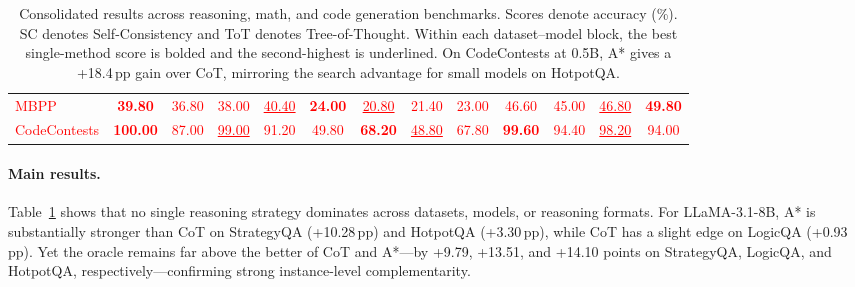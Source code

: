 \documentclass[10pt]{article}
\begin{document}
\begin{table}[t]
{\begin{tabular}{lcccc|cccc|cccc}
\textcolor{red}{MBPP}
& \textcolor{red}{\textbf{39.80}} & \textcolor{red}{36.80} & \textcolor{red}{38.00} & \textcolor{red}{\underline{40.40}}
& \textcolor{red}{\textbf{24.00}} & \textcolor{red}{\underline{20.80}} & \textcolor{red}{21.40} & \textcolor{red}{23.00}
& \textcolor{red}{46.60} & \textcolor{red}{45.00} & \textcolor{red}{\underline{46.80}} & \textcolor{red}{\textbf{49.80}} \\

\textcolor{red}{CodeContests}
& \textcolor{red}{\textbf{100.00}} & \textcolor{red}{87.00} & \textcolor{red}{\underline{99.00}} & \textcolor{red}{91.20}
& \textcolor{red}{49.80} & \textcolor{red}{\textbf{68.20}} & \textcolor{red}{\underline{48.80}} & \textcolor{red}{67.80}
& \textcolor{red}{\textbf{99.60}} & \textcolor{red}{94.40} & \textcolor{red}{\underline{98.20}} & \textcolor{red}{94.00} \\
\bottomrule
\end{tabular}
}
\caption{Consolidated results across reasoning, math, and code generation benchmarks. Scores denote accuracy (\%). SC denotes Self-Consistency and ToT denotes Tree-of-Thought. Within each dataset--model block, the best single-method score is bolded and the second-highest is underlined. On CodeContests at 0.5B, A* gives a +18.4\,pp gain over CoT, mirroring the search advantage for small models on HotpotQA.}
\label{tab:consolidated-main-results}
\end{table}




\paragraph{Main results.}
Table~\ref{tab:consolidated-main-results} shows that no single reasoning strategy dominates across datasets, models, or reasoning formats. For LLaMA-3.1-8B, A* is substantially stronger than CoT on StrategyQA (+10.28\,pp) and HotpotQA (+3.30\,pp), while CoT has a slight edge on LogicQA (+0.93\,pp). Yet the oracle remains far above the better of CoT and A*---by +9.79, +13.51, and +14.10 points on StrategyQA, LogicQA, and HotpotQA, respectively---confirming strong instance-level complementarity. 
\end{document}
